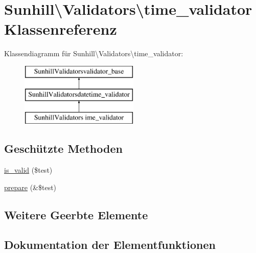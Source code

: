 \hypertarget{classSunhill_1_1Validators_1_1time__validator}{}\section{Sunhill\textbackslash{}Validators\textbackslash{}time\+\_\+validator Klassenreferenz}
\label{classSunhill_1_1Validators_1_1time__validator}
Klassendiagramm für Sunhill\textbackslash{}Validators\textbackslash{}time\+\_\+validator\+:\begin{figure}[H]
\begin{center}
\leavevmode
\includegraphics[height=3.000000cm]{dd/dd7/classSunhill_1_1Validators_1_1time__validator}
\end{center}
\end{figure}
\subsection*{Geschützte Methoden}
\begin{DoxyCompactItemize}
\item 
\hyperlink{classSunhill_1_1Validators_1_1time__validator_aeb79f0e644c04403ca53dae559aac36b}{is\+\_\+valid} (\$test)
\item 
\hyperlink{classSunhill_1_1Validators_1_1time__validator_a2058db27cb8583e4e3535449d7caa26b}{prepare} (\&\$test)
\end{DoxyCompactItemize}
\subsection*{Weitere Geerbte Elemente}


\subsection{Dokumentation der Elementfunktionen}
\mbox{\label{classSunhill_1_1Validators_1_1time__validator_aeb79f0e644c04403ca53dae559aac36b}} 
